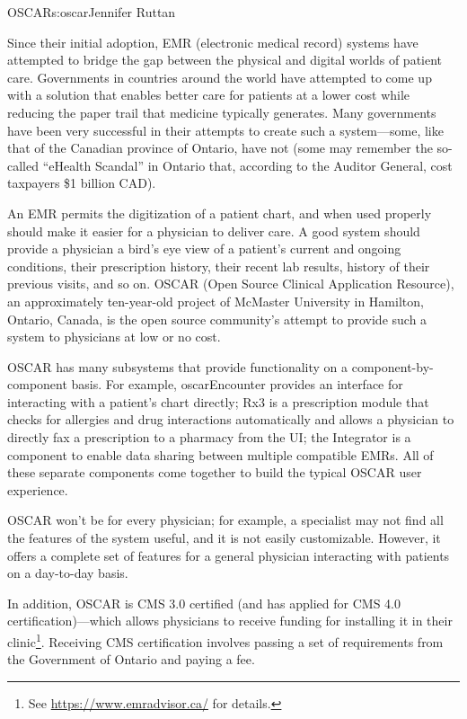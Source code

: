 \begin{aosachapter}{OSCAR}{s:oscar}{Jennifer Ruttan}

Since their initial adoption, EMR (electronic medical record) systems
have attempted to bridge the gap between the physical and digital
worlds of patient care. Governments in countries around the world have
attempted to come up with a solution that enables better care for
patients at a lower cost while reducing the paper trail that medicine
typically generates. Many governments have been very successful in their
attempts to create such a system---some, like that of the Canadian province of
Ontario, have not (some may remember the so-called ``eHealth Scandal''
in Ontario that, according to the Auditor General, cost taxpayers \$1
billion CAD).

An EMR permits the digitization of a patient chart, and when used
properly should make it easier for a physician to deliver care. A good
system should provide a physician a bird's eye view of a patient's
current and ongoing conditions, their prescription history, their
recent lab results, history of their previous visits, and so on. OSCAR
(Open Source Clinical Application Resource), an approximately
ten-year-old project of McMaster University in Hamilton, Ontario,
Canada, is the open source community's attempt to provide such a system
to physicians at low or no cost.

OSCAR has many subsystems that provide functionality on a
component-by-component basis. For example, oscarEncounter provides an
interface for interacting with a patient's chart directly; Rx3 is a
prescription module that checks for allergies and drug interactions
automatically and allows a physician to directly fax a prescription to
a pharmacy from the UI; the Integrator is a component to enable data
sharing between multiple compatible EMRs. All of these separate
components come together to build the typical OSCAR user experience.

OSCAR won't be for every physician; for example, a specialist may not
find all the features of the system useful, and it is not easily
customizable. However, it offers a complete set of features for a
general physician interacting with patients on a day-to-day basis.

In addition, OSCAR is CMS 3.0 certified (and has applied for CMS 4.0
certification)---which allows physicians to receive funding for
installing it in their
clinic\footnote{See \url{https://www.emradvisor.ca/} for
details.}. Receiving CMS certification involves passing a set of
requirements from the Government of Ontario and paying a fee.


\end{aosachapter}
